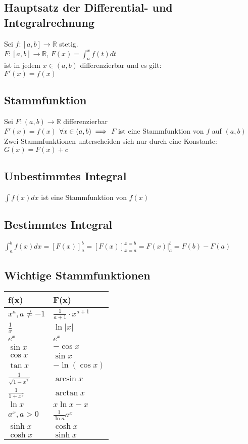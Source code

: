 \documentclass[a4paper,9pt]{extarticle}
\newcommand{\intab}[1] {\int_{a}^{b} #1 dx}
\begin{document}
	\subsection*{Hauptsatz der Differential- und Integralrechnung}
	Sei $f : [a,b] → \mathbb{R}$ stetig. \\
	$F : [a,b] → \mathbb{R}$, $F(x) = \int_a^x f(t) dt$ \\ ist in jedem $x \in (a,b)$ differenzierbar und es gilt: \\
	$F'(x) = f(x)$
	
	\subsection*{Stammfunktion}
	Sei $F : (a,b) → \mathbb{R}$ differenzierbar \\
	$F'(x) = f(x)$ $\forall x \in (a,b) \\
	\implies$ $F$ ist eine Stammfunktion von $f$ auf $(a,b)$ \\
	
	Zwei Stammfunktionen unterscheiden sich nur durch eine Konstante: $G(x) = F(x) + c$
	
	\subsection*{Unbestimmtes Integral}
	$\int f(x) dx$ ist eine Stammfunktion von $f(x)$
	
	\subsection*{Bestimmtes Integral}
	$\intab{f(x)} = [F(x)]_a^b = [F(x)]_{x=a}^{x=b} = F(x)|_a^b = F(b) - F(a)$
	
	\renewcommand{\arraystretch}{1.3}
	\subsection*{Wichtige Stammfunktionen}
	\begin{tabular}{l|l}
		f(x) & F(x) \\
		\hline
		$x^a, a≠-1$ & $\frac{1}{a + 1} ⋅ x^{a+1}$ \\
		$\frac{1}{x}$ & $\ln|x|$ \\
		$e^x$ & $e^x$ \\
		$\sin x$ & $-\cos x$ \\
		$\cos x$ & $\sin x$ \\
		$\tan x$ & $-\ln (\cos x)$ \\
		$\frac{1}{\sqrt{1-x^2}}$ & $\arcsin x$ \\
		$\frac{1}{1 + x^2}$ & $\arctan x$ \\
		$\ln x$ & $x\ln x -x$ \\
		$a^x, a > 0$ & $\frac 1 {\ln a} a^x$ \\
		$\sinh x$ & $\cosh x$ \\
		$\cosh x$ & $\sinh x$ \\
	\end{tabular}
	\renewcommand{\arraystretch}{1}		
	
\end{document}

